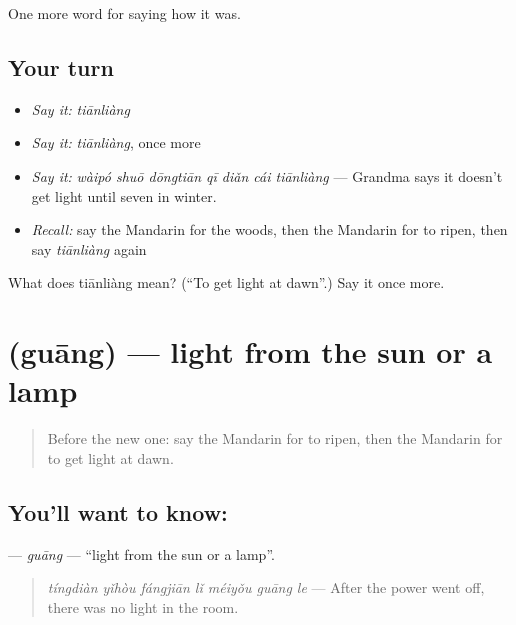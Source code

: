 \begin{grammarlens}[title={What you've built}]
One more word for saying how it was.
\end{grammarlens}

\subsection*{Your turn}
\begin{itemize}
\raggedright
  \item \emph{Say it:} \emph{tiānliàng}
  \item \emph{Say it:} \emph{tiānliàng}, once more
  \item \emph{Say it:} \emph{wàipó shuō dōngtiān qī diǎn cái tiānliàng} — Grandma says it doesn't get light until seven in winter.
  \item \emph{Recall:} say the Mandarin for the woods, then the Mandarin for to ripen, then say \emph{tiānliàng} again
\end{itemize}

\begin{tcolorbox}[breakable,colback=teal!4,colframe=teal!35!black,title={Before you move on}]
What does tiānliàng mean? (\textquotedblleft{}To get light at dawn\textquotedblright{}.) Say it once more.
\end{tcolorbox}
\section[\texorpdfstring{\zh{光} (guāng)}{光 (guāng)}]{ (guāng) — light from the sun or a lamp}

\label{lesson:ZH-C517-guang-light}



\begin{quote}
Before the new one: say the Mandarin for to ripen, then the Mandarin for to get light at dawn.
\end{quote}

\subsection*{You'll want to know: }
\textbf{} — \emph{guāng} — \textquotedblleft{}light from the sun or a lamp\textquotedblright{}.

\begin{quote}
\textbf{} \emph{tíngdiàn yǐhòu fángjiān lǐ méiyǒu guāng le} — After the power went off, there was no light in the room.
\end{quote}


